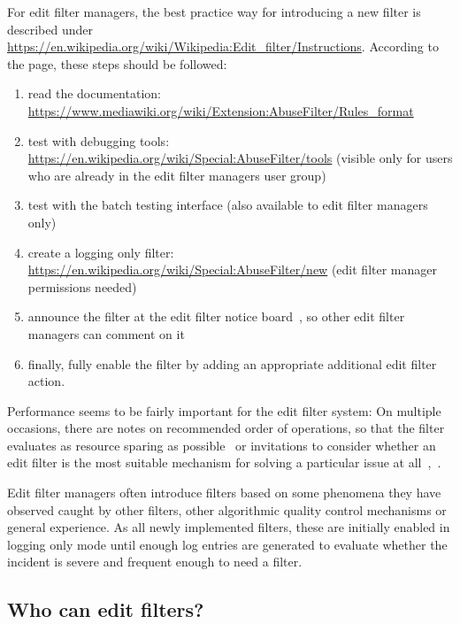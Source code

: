 For edit filter managers, the best practice way for introducing a new filter is described under \url{https://en.wikipedia.org/wiki/Wikipedia:Edit_filter/Instructions}.
According to the page, these steps should be followed:
\begin{enumerate}
    \item read the documentation: \url{https://www.mediawiki.org/wiki/Extension:AbuseFilter/Rules_format}
    \item test with debugging tools: \url{https://en.wikipedia.org/wiki/Special:AbuseFilter/tools} (visible only for users who are already in the edit filter managers user group)
    \item test with the batch testing interface (also available to edit filter managers only)
    \item create a logging only filter: \url{https://en.wikipedia.org/wiki/Special:AbuseFilter/new} (edit filter manager permissions needed)
    \item announce the filter at the edit filter notice board~\cite{Wikipedia:EditFilterNoticeboard}, so other edit filter managers can comment on it
    \item finally, fully enable the filter by adding an appropriate additional edit filter action.
\end{enumerate}

Performance seems to be fairly important for the edit filter system:
On multiple occasions, there are notes on recommended order of operations, so that the filter evaluates as resource sparing as possible~\cite{Wikipedia:EditFilterInstructions} or invitations to consider whether an edit filter is the most suitable mechanism for solving a particular issue at all~\cite{Wikipedia:EditFilter},~\cite{Wikipedia:EditFilterRequested}.

Edit filter managers often introduce filters based on some phenomena they have observed caught by other filters, other algorithmic quality control mechanisms or general experience.
As all newly implemented filters, these are initially enabled in logging only mode until enough log entries are generated to evaluate whether the incident is severe and frequent enough to need a filter.


\subsection{Who can edit filters?}
\label{section:who-can-edit}


